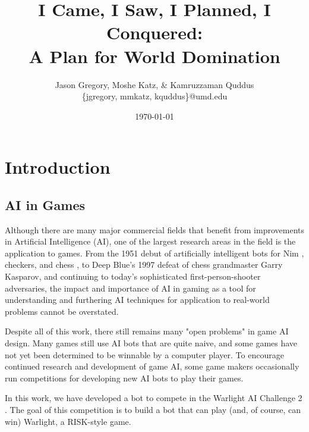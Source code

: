 \documentclass[a4paper,11pt]{article}
\begin{document}
\title{I Came, I Saw, I Planned, I Conquered: \\ A Plan for World Domination}
\author{Jason Gregory, Moshe Katz, \& Kamruzzaman Quddus \\ \{jgregory, mmkatz, kquddus\}@umd.edu}
\date{\today}

\maketitle


\section{Introduction}\label{sec:intro}
\subsection{AI in Games}\label{aiingames}
Although there are many major commercial fields that benefit from improvements
in Artificial Intelligence (AI), one of the largest research areas in the field is
the application to games.  From the 1951 debut of artificially intelligent bots
for Nim \cite{nim}, checkers, and chess \cite{checkerschess}, to Deep Blue's 1997
defeat of chess grandmaster Garry Kasparov, and continuing to today's sophisticated
first-person-shooter adversaries, the impact and importance of AI in gaming as a
tool for understanding and furthering AI techniques for application to real-world 
problems cannot be overstated.

Despite all of this work, there still remains many "open problems" in game AI
design.  Many games still use AI bots that are quite naive, and some games have
not yet been determined to be winnable by a computer player. To encourage continued
research and development of game AI, some game makers occasionally run competitions
for developing new AI bots to play their games.

In this work, we have developed a bot to compete in the Warlight AI Challenge 2 
\cite{warlight}. The goal of this competition is to build a bot that can play (and, of 
course, can win) Warlight, a RISK-style game.
\end{document}
